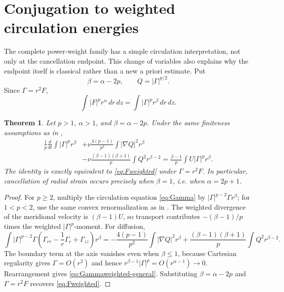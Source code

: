 \documentclass[11pt]{article}
\numberwithin{equation}{section}
\newtheorem{theorem}{Theorem}[section]
\theoremstyle{remark}
\begin{document}
\section{Conjugation to weighted circulation energies}

The complete power-weight family has a simple circulation interpretation, not only at the cancellation endpoint.  This change of variables also explains why the endpoint itself is classical rather than a new a priori estimate.  Put
\[
 \beta=\alpha-2p,
 \qquad Q=|\Gamma|^{p/2}.
\]
Since \(\Gamma=r^2F\),
\begin{equation}\label{eq:general-energy-conjugate}
 \int |F|^pr^\alpha\,dr\,dz
 =\int |\Gamma|^pr^\beta\,dr\,dz.
\end{equation}

\begin{theorem}\label{thm:Gammaweighted}
Let \(p>1\), \(\alpha>1\), and \(\beta=\alpha-2p\).  Under the same finiteness assumptions as in ,
\begin{align}
 \frac1p\frac d{dt}\int|\Gamma|^pr^\beta
 &+\nu\frac{4(p-1)}{p^2}\int|\nabla Q|^2r^\beta\nonumber\\
 &-\nu\frac{(\beta-1)(\beta+1)}p
   \int Q^2r^{\beta-2}
 =\frac{\beta-1}{p}\int U|\Gamma|^pr^\beta.
 \label{eq:Gammaweighted-general}
\end{align}
The identity is exactly equivalent to \eqref{eq:Fweighted} under \(\Gamma=r^2F\).  In particular, cancellation of radial strain occurs precisely when \(\beta=1\), i.e. when \(\alpha=2p+1\).
\end{theorem}

\begin{proof}
For \(p\ge2\), multiply the circulation equation \eqref{eq:Gamma} by \(|\Gamma|^{p-2}\Gamma r^\beta\); for \(1<p<2\), use the same convex renormalization as in .  The weighted divergence of the meridional velocity is \((\beta-1)U\), so transport contributes \(-(\beta-1)/p\) times the weighted \(|\Gamma|^p\)-moment.  For diffusion,
\[
 \int |\Gamma|^{p-2}\Gamma
 \left(\Gamma_{rr}-\frac1r\Gamma_r+\Gamma_{zz}\right)r^\beta
 =-\frac{4(p-1)}{p^2}\int|\nabla Q|^2r^\beta
 +\frac{(\beta-1)(\beta+1)}p\int Q^2r^{\beta-2}.
\]
The boundary term at the axis vanishes even when \(\beta\le1\), because Cartesian regularity gives \(\Gamma=O(r^2)\) and hence
\(r^{\beta-1}|\Gamma|^p=O(r^{\alpha-1})\to0\).  Rearrangement gives \eqref{eq:Gammaweighted-general}.  Substituting \(\beta=\alpha-2p\) and \(\Gamma=r^2F\) recovers \eqref{eq:Fweighted}.
\end{proof}
\end{document}
